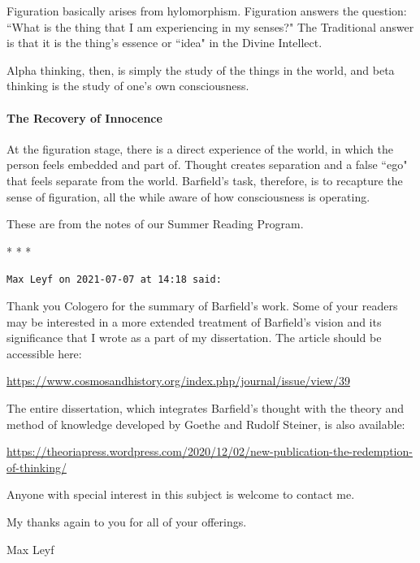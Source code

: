 Figuration basically arises from hylomorphism. Figuration answers the question: ``What is the thing that I am experiencing in my senses?" The Traditional answer is that it is the thing's essence or ``idea" in the Divine Intellect.

Alpha thinking, then, is simply the study of the things in the world, and beta thinking is the study of one's own consciousness.

\paragraph{The Recovery of Innocence}
At the figuration stage, there is a direct experience of the world, in which the person feels embedded and part of. Thought creates separation and a false ``ego" that feels separate from the world. Barfield's task, therefore, is to recapture the sense of figuration, all the while aware of how consciousness is operating.


\hfill

These are from the notes of our Summer Reading Program.




\begin{center}* * *\end{center}

\begin{footnotesize}\begin{sffamily}



\texttt{Max Leyf on 2021-07-07 at 14:18 said: }

Thank you Cologero for the summary of Barfield's work. Some of your readers may be interested in a more extended treatment of Barfield's vision and its significance that I wrote as a part of my dissertation. The article should be accessible here:

\url{https://www.cosmosandhistory.org/index.php/journal/issue/view/39}

The entire dissertation, which integrates Barfield's thought with the theory and method of knowledge developed by Goethe and Rudolf Steiner, is also available:

\url{https://theoriapress.wordpress.com/2020/12/02/new-publication-the-redemption-of-thinking/}

Anyone with special interest in this subject is welcome to contact me.

My thanks again to you for all of your offerings.

Max Leyf


\end{sffamily}\end{footnotesize}

